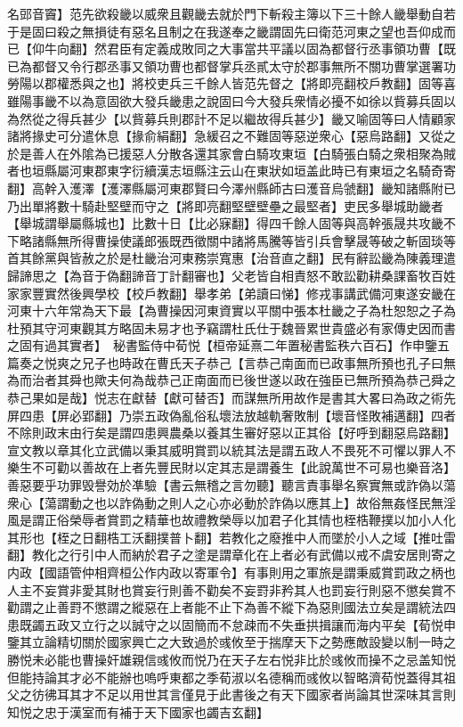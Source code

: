 名郖音竇】范先欲殺畿以威衆且觀畿去就於門下斬殺主簿以下三十餘人畿舉動自若于是固曰殺之無損徒有惡名且制之在我遂奉之畿謂固先曰衛范河東之望也吾仰成而已【仰牛向翻】然君臣有定義成敗同之大事當共平議以固為都督行丞事領功曹【既已為都督又令行郡丞事又領功曹也都督掌兵丞貳太守於郡事無所不關功曹掌選署功勞陽以郡權悉與之也】將校吏兵三千餘人皆范先督之【將即亮翻校戶教翻】固等喜雖陽事畿不以為意固欲大發兵畿患之說固曰今大發兵衆情必擾不如徐以貲募兵固以為然從之得兵甚少【以貲募兵則郡計不足以繼故得兵甚少】畿又喻固等曰人情顧家諸將掾史可分遣休息【掾俞絹翻】急緩召之不難固等惡逆衆心【惡烏路翻】又從之於是善人在外隂為已援惡人分散各還其家會白騎攻東垣【白騎張白騎之衆相聚為賊者也垣縣屬河東郡東字衍續漢志垣縣注云山在東狀如垣盖此時已有東垣之名騎奇寄翻】高幹入濩澤【濩澤縣屬河東郡賢曰今澤州縣師古曰濩音烏虢翻】畿知諸縣附已乃出單將數十騎赴堅壁而守之【將即亮翻堅壁壁壘之最堅者】吏民多舉城助畿者【舉城謂舉屬縣城也】比數十日【比必寐翻】得四千餘人固等與高幹張晟共攻畿不下略諸縣無所得曹操使議郎張既西徵關中諸將馬騰等皆引兵會擊晟等破之斬固琰等首其餘黨與皆赦之於是杜畿治河東務崇寬惠【治音直之翻】民有辭訟畿為陳義理遣歸諦思之【為音于偽翻諦音丁計翻審也】父老皆自相責怒不敢訟勸耕桑課畜牧百姓家家豐實然後興學校【校戶教翻】舉孝弟【弟讀曰悌】修戎事講武備河東遂安畿在河東十六年常為天下最【為曹操因河東資實以平關中張本杜畿之子為杜恕恕之子為杜預其守河東觀其方略固未易才也予竊謂杜氏仕于魏晉累世貴盛必有家傳史因而書之固有過其實者】　秘書監侍中荀悦【桓帝延熹二年置秘書監秩六百石】作申鑒五篇奏之悦爽之兄子也時政在曹氏天子恭己【言恭己南面而已政事無所預也孔子曰無為而治者其舜也歟夫何為哉恭己正南面而已後世遂以政在強臣已無所預為恭己舜之恭己果如是哉】悦志在獻替【獻可替否】而謀無所用故作是書其大畧曰為政之術先屏四患【屏必郢翻】乃崇五政偽亂俗私壞法放越軌奢敗制【壞音怪敗補邁翻】四者不除則政末由行矣是謂四患興農桑以養其生審好惡以正其俗【好呼到翻惡烏路翻】宣文教以章其化立武備以秉其威明賞罰以統其法是謂五政人不畏死不可懼以罪人不樂生不可勸以善故在上者先豐民財以定其志是謂養生【此說萬世不可易也樂音洛】善惡要乎功罪毁譽効於凖驗【書云無稽之言勿聽】聽言責事舉名察實無或詐偽以蕩衆心【蕩謂動之也以詐偽動之則人之心亦必動於詐偽以應其上】故俗無姦怪民無淫風是謂正俗榮辱者賞罰之精華也故禮教榮辱以加君子化其情也桎梏鞭撲以加小人化其形也【桎之日翻梏工沃翻撲普卜翻】若教化之廢推中人而墜於小人之域【推吐雷翻】教化之行引中人而納於君子之塗是謂章化在上者必有武備以戒不虞安居則寄之内政【國語管仲相齊桓公作内政以寄軍令】有事則用之軍旅是謂秉威賞罰政之柄也人主不妄賞非愛其財也賞妄行則善不勸矣不妄罸非矜其人也罰妄行則惡不懲矣賞不勸謂之止善罸不懲謂之縱惡在上者能不止下為善不縱下為惡則國法立矣是謂統法四患既蠲五政又立行之以誠守之以固簡而不怠疎而不失垂拱揖讓而海内平矣【荀悦申鑒其立論精切關於國家興亡之大致過於彧攸至于揣摩天下之勢應敵設變以制一時之勝悦未必能也曹操奸雄親信彧攸而悦乃在天子左右悦非比於彧攸而操不之忌盖知悦但能持論其才必不能辦也嗚呼東都之季荀淑以名德稱而彧攸以智略濟荀悦蓋得其祖父之彷彿耳其才不足以用世其言僅見于此書後之有天下國家者尚論其世深味其言則知悦之忠于漢室而有補于天下國家也蠲吉玄翻】

